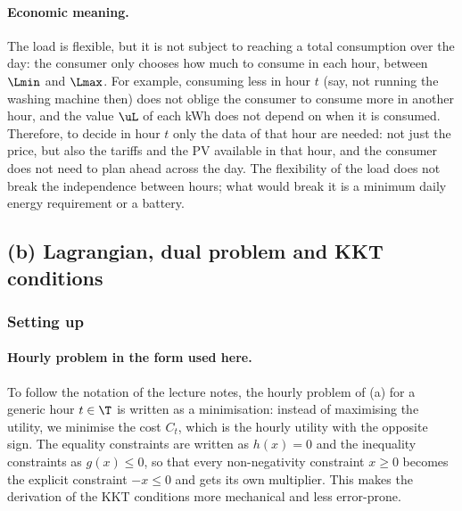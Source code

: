 \paragraph{Economic meaning.}

The load is flexible, but it is not subject to reaching a total consumption over the day:
the consumer only chooses how much to consume in each hour, between $\Lmin$ and $\Lmax$. For
example, consuming less in hour $t$ (say, not running the washing machine then) does not
oblige the consumer to consume more in another hour, and the value $\uL$ of each kWh does
not depend on when it is consumed. Therefore, to decide in hour $t$ only the data of that
hour are needed: not just the price, but also the tariffs and the PV available in that
hour, and the consumer does not need to plan ahead across the day. The flexibility of the
load does not break the independence between hours; what would break it is a minimum daily
energy requirement or a battery.

\subsection{(b) Lagrangian, dual problem and KKT conditions}

\subsubsection{Setting up}
\paragraph{Hourly problem in the form used here.}
To follow the notation of the lecture notes, the hourly problem of (a) for a generic hour
$t \in \T$ is written as a minimisation: instead of maximising the utility, we minimise the
cost $C_t$, which is the hourly utility with the opposite sign. The equality constraints are
written as $h(x) = 0$ and the inequality constraints as $g(x) \leq 0$, so that every
non-negativity constraint $x \geq 0$ becomes the explicit constraint $-x \leq 0$ and gets its
own multiplier. This makes the derivation of the KKT conditions more mechanical and less
error-prone.


